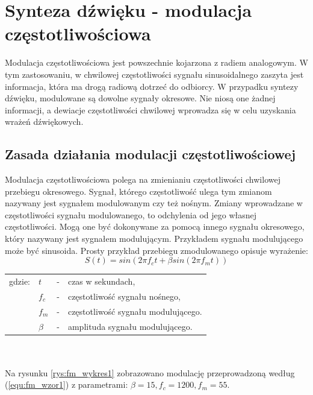 \chapter{Synteza dźwięku - modulacja częstotliwościowa}\label{chapter_fm}
Modulacja częstotliwościowa jest powszechnie kojarzona z radiem analogowym. W tym zastosowaniu, w chwilowej częstotliwości sygnału sinusoidalnego zaszyta jest informacja, która ma drogą radiową dotrzeć do odbiorcy. W przypadku syntezy dźwięku, modulowane są dowolne sygnały okresowe. Nie niosą one żadnej informacji, a dewiacje częstotliwości chwilowej wprowadza się w celu uzyskania wrażeń dźwiękowych.
\section{Zasada działania modulacji częstotliwościowej}
Modulacja częstotliwościowa polega na zmienianiu częstotliwości chwilowej przebiegu okresowego. Sygnał, którego częstotliwość ulega tym zmianom nazywany jest sygnałem modulowanym czy też nośnym. Zmiany wprowadzane w częstotliwości sygnału modulowanego, to odchylenia od jego własnej częstotliwości. Mogą one być dokonywane za pomocą innego sygnału okresowego, który nazywany jest sygnałem modulującym. Przykładem sygnału modulującego może być sinusoida. Prosty przykład przebiegu zmodulowanego opisuje wyrażenie:
\begin{equation} \label{equ:fm_wzor1}
S(t)= sin(2 \pi f_c t + \beta sin(2 \pi f_m t))
\end{equation}
\begin{tabular}{ l l l l}
	gdzie: & $t$ &  - & czas w sekundach, \\
	&	$f_c$ & - &  częstotliwość sygnału nośnego,\\
	&	$f_m$ & - &  częstotliwość sygnału modulującego.\\
	&	$\beta$ & - & amplituda sygnału modulującego.\\
\end{tabular} \\ \\
Na rysunku \ref{rys:fm_wykres1} zobrazowano modulację przeprowadzoną według (\ref{equ:fm_wzor1}) z parametrami: $\beta = 15, f_c = 1200, f_m = 55$.

